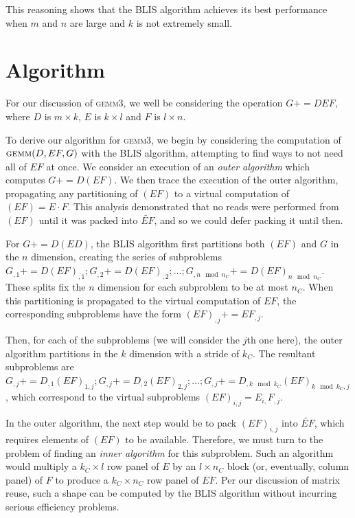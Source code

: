 \documentclass[12pt]{article}
\newcommand*{\pluseq}{\mathrel{{+}{=}}}
\newcommand*{\gemmt}{{\textsc{gemm3}}}
\begin{document}
This reasoning shows that the BLIS algorithm achieves its best performance when $m$ and $n$ are large and $k$ is not extremely small.

\section{Algorithm}
For our discussion of \gemmt{}, we well be considering the operation $G \pluseq DEF$, where $D$ is $m \times k$, $E$ is $k \times l$ and $F$ is $l \times n$.

To derive our algorithm for \gemmt{}, we begin by considering the computation of $\textsc{gemm}(D, EF, G)$ with the BLIS algorithm, attempting to find ways to not need all of $EF$ at once.
We consider an execution of an \emph{outer algorithm} which computes $G \pluseq D(EF)$.
We then trace the execution of the outer algorithm, propagating any partitioning of $(EF)$ to a virtual computation of $(EF) = E \cdot F$.
This analysis demonstrated that no reads were performed from $(EF)$ until it was packed into $\widetilde{EF}$, and so we could defer packing it until then.

For $G \pluseq D(ED)$, the BLIS algorithm first partitions both $(EF)$ and $G$ in the $n$ dimension, creating the series of subproblems $G_{,1} \pluseq D(EF)_{,1}; G_{,2} \pluseq D(EF)_{,2}; \ldots; G_{,n \mod n_C} \pluseq D(EF)_{n \mod n_C}$.
These splits fix the $n$ dimension for each subproblem to be at most $n_C$.
When this partitioning is propagated to the virtual computation of $EF$, the corresponding subproblems have the form $(EF)_{,j} \pluseq EF_{,j}$.

Then, for each of the subproblems (we will consider the $j$th one here), the outer algorithm partitions in the $k$ dimension with a stride of $k_C$.
The resultant subproblems are $G_{,j} \pluseq D_{,1}(EF)_{1,j}; G_{,j} \pluseq D_{,2}(EF)_{2,j}; \ldots; G_{,j} \pluseq D_{,k \mod k_C}(EF)_{k \mod k_C,j}$, which correspond to the virtual subproblems $(EF)_{i,j} = E_{i,}F_{,j}$.

In the outer algorithm, the next step would be to pack $(EF)_{i,j}$ into $\widetilde{EF}$, which requires elements of $(EF)$ to be available.
Therefore, we must turn to the problem of finding an \emph{inner algorithm} for this subproblem.
Such an algorithm would multiply a  $k_C \times l$ row panel of $E$ by an $l \times n_C$ block (or, eventually, column panel) of $F$ to produce a $k_C \times n_C$ row panel of $EF$.
Per our discussion of matrix reuse, such a shape can be computed by the BLIS algorithm without incurring serious efficiency problems.
\end{document}
